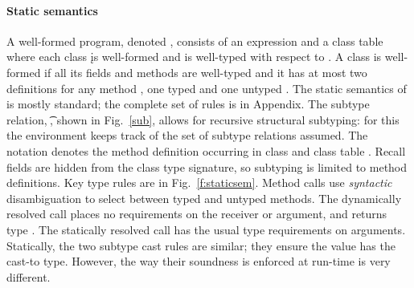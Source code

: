 \documentclass[acmlarge, anonymous, authordraft]{acmart}
\begin{document}
\paragraph{Static semantics}
A well-formed program, denoted \WFp\e\K, consists of an expression \e and a
class table \K where each class \k is well-formed and \e is well-typed with
respect to \K.  A class is well-formed if all its fields and methods are
well-typed and it has at most two definitions for any method \m, one typed
\Mdef\m\x\C\D\e and one untyped \Mdef\m\x\any\any\e.  The static semantics
of \kafka is mostly standard; the complete set of rules is in Appendix.  The
subtype relation, \StrSub\M\K\t\tp, shown in Fig.~\ref{sub}, allows for
recursive structural subtyping: for this the environment \M keeps track of
the set of subtype relations assumed.  The notation \md\In\App\K\C denotes
the method definition \md occurring in class \C and class table \K.  Recall
fields are hidden from the class type signature, so subtyping is limited to
method definitions.  Key type rules are in Fig.~\ref{f:staticsem}.  Method
calls use \emph{syntactic} disambiguation to select between typed and
untyped methods. The dynamically resolved call places no requirements on the
receiver or argument, and returns type \any.  The statically resolved call
has the usual type requirements on arguments. Statically, the two subtype
cast rules are similar; they ensure the value has the cast-to type. However,
the way their soundness is enforced at run-time is very different.
\end{document}
